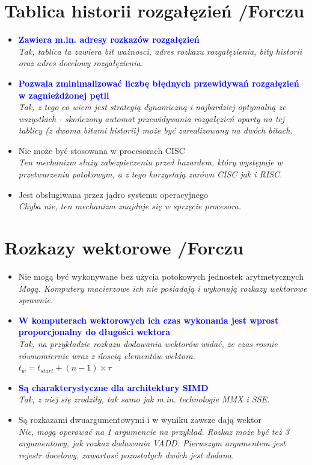 \documentclass[a4paper,twoside]{article}
\begin{document}
\section{Tablica historii rozgałęzień {\small /Forczu}}
	\begin{itemize}
    \item \textcolor{Blue}{\textbf{Zawiera m.in. adresy rozkazów rozgałęzień}}\\
    {\small \emph{Tak, tablica ta zawiera bit ważnosci, \emph{adres rozkazu rozgałęzienia}, bity historii oraz \emph{adres docelowy rozgałęzienia}.}}
    \item \textcolor{Blue}{\textbf{Pozwala zminimalizować liczbę błędnych przewidywań rozgałęzień w zagnieżdżonej pętli}}\\
    {\small \emph{Tak, z tego co wiem jest strategią dynamiczną i najbardziej optymalną ze wszystkich - skończony automat przewidywania rozgałęzień oparty na tej tablicy (z dwoma bitami historii) może być zarealizowany na dwóch bitach.}}
    \item Nie może być stosowana w procesorach CISC\\
    {\small \emph{Ten mechanizm służy zabezpieczeniu przed hazardem, który występuje w przetwarzeniu potokowym, a z tego korzystają zarówn CISC jak i RISC.}}
    \item Jest obsługiwana przez jądro systemu operacyjnego\\
    {\small \emph{Chyba nie, ten mechanizm znajduje się w sprzęcie procesora.}}
    \end{itemize}

\section{Rozkazy wektorowe {\small /Forczu}}
	\begin{itemize}
    \item Nie mogą być wykonywane bez użycia potokowych jednostek arytmetycznych\\
    {\small \emph{Mogą. Komputery macierzowe ich nie posiadają i wykonują rozkazy wektorowe sprawnie.}}
    \item \textcolor{Blue}{\textbf{W komputerach wektorowych ich czas wykonania jest wprost proporcjonalny do długości wektora}}\\
    {\small \emph{Tak, na przykładzie rozkazu dodawania wektorów widać, że czas rosnie równomiernie wraz z iloscią elementów wektora.\\
    $t_{w}=t_{start}+(n-1)\times\tau$}}
    \item \textcolor{Blue}{\textbf{Są charakterystyczne dla architektury SIMD}}\\
    {\small \emph{Tak, z niej się zrodziły, tak samo jak m.in. technologie MMX i SSE.}}
    \item Są rozkazami dwuargumentowymi i w wyniku zawsze dają wektor\\
    {\small \emph{Nie, mogą operować na 1 argumencie na przykład. Rozkaz może być też 3 argumentowy, jak rozkaz dodawania VADD. Pierwszym argumentem jest rejestr docelowy, zawartosć pozostałych dwóch jest dodana.}}
    \end{itemize}
\end{document}
